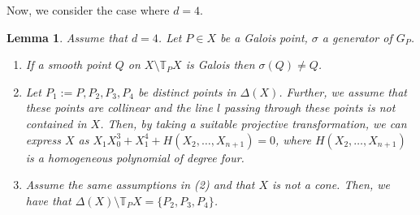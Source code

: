 \documentclass[10pt,oneside]{amsart}
\newtheorem{lemma}{Lemma}
\theoremstyle{definition}
\begin{document}
Now, we consider the case where $d=4$. 

\begin{lemma}\label{OutsideTangent} 
Assume that $d=4$. Let $P \in X$ be a Galois point, $\sigma$ a generator of $G_P$. 
\begin{enumerate}
\item  If a smooth point $Q$ on $X \setminus \mathbb{T}_PX$ is Galois then $\sigma(Q) \ne Q$. 
\item Let $P_1:=P, P_2, P_3, P_4$ be distinct points in $\Delta(X)$. 
Further, we assume that these points are collinear and the line $l$ passing through these points is not contained in $X$. 
Then, by taking a suitable projective transformation, we can express $X$ as $X_1X_{0}^3+X_1^4+H(X_2,\dots,X_{n+1})=0$, where $H(X_2,\dots,X_{n+1})$ is a homogeneous polynomial of degree four. 
\item Assume the same assumptions in (2) and that $X$ is not a cone. 
Then, we have that $\Delta(X) \setminus \mathbb{T}_{P}X = \{P_2, P_3, P_4 \}$. 
\end{enumerate}
\end{lemma}
\end{document}
